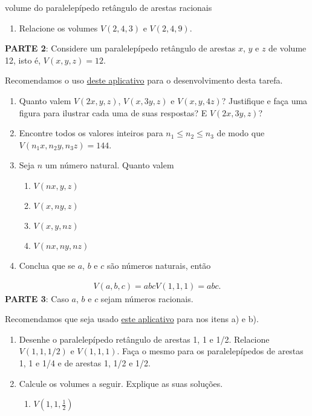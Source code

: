 \begin{task}{volume do paralelepípedo retângulo de arestas racionais}
\begin{enumerate}
\item {} 
Relacione os volumes \(V(2, 4, 3)\) e \(V(2, 4, 9)\).

\end{enumerate}

\textbf{PARTE 2}: Considere um paralelepípedo retângulo de arestas \(x\), \(y\) e \(z\) de volume 12, isto é, \(V(x, y, z) = 12\).

Recomendamos o uso \href{https://ggbm.at/uq2gd3ub}{deste aplicativo}  para o desenvolvimento desta tarefa.
\begin{enumerate}
\item {} 
Quanto valem \(V(2x, y, z)\), \(V(x, 3y, z)\) e \(V(x, y, 4z)\)? Justifique e faça uma figura para ilustrar cada uma de suas respostas? E  \(V(2x, 3y, z)\)?

\item {} 
Encontre todos os valores inteiros para \(n_1\leq n_2 \leq n_3\) de modo que \(V(n_1 x, n_2 y, n_3 z) = 144\).

\item {} 
Seja \(n\) um número natural. Quanto valem 

\begin{enumerate}
\item\(V(nx, y, z)\)
\item\(V(x, ny, z)\)
\item\(V(x, y, nz)\)
\item\(V(n x, n y, n z)\)
\end{enumerate}

\item {} 
Conclua que se \(a\), \(b\) e \(c\) são números naturais, então

\end{enumerate}
\begin{equation*}
\begin{split}V(a, b, c) = abc V(1,1,1) = abc.\end{split}
\end{equation*}
\textbf{PARTE 3}: Caso \(a\), \(b\) e \(c\) sejam números racionais.

Recomendamos que seja usado \href{https://ggbm.at/zzdv6are}{este aplicativo} para nos itens a) e b).
\begin{enumerate}
\item {} 
Desenhe o paralelepípedo retângulo de arestas 1, 1 e 1/2. Relacione \(V(1,1,1/2)\) e \(V(1,1,1)\). Faça o mesmo para os paralelepípedos de arestas 1, 1 e 1/4 e de arestas 1, 1/2 e 1/2.

\item {} 
Calcule os volumes a seguir. Explique as suas soluções.
\begin{enumerate}
\item {} 
\(V\left(1, 1, \frac{1}{2}\right)\)


\end{enumerate}
\end{enumerate}
\end{task}
